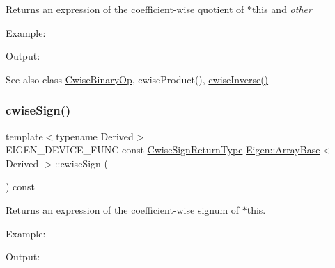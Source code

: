 \begin{DoxyReturn}{Returns}
an expression of the coefficient-\/wise quotient of $\ast$this and {\itshape other} 
\end{DoxyReturn}
Example\+: 
\begin{DoxyCodeInclude}{0}
\end{DoxyCodeInclude}
 Output\+: 
\begin{DoxyVerbInclude}
\end{DoxyVerbInclude}


\begin{DoxySeeAlso}{See also}
class \mbox{\hyperlink{class_eigen_1_1_cwise_binary_op}{Cwise\+Binary\+Op}}, cwise\+Product(), \mbox{\hyperlink{class_eigen_1_1_array_base_a37217e1af9759d31758b61cb9d9a2eb0}{cwise\+Inverse()}} 
\end{DoxySeeAlso}
\mbox{\label{class_eigen_1_1_array_base_a100fa382843831044abbf77ca9280eaa}} 
\subsubsection{\texorpdfstring{cwiseSign()}{cwiseSign()}}
{\footnotesize\ttfamily template$<$typename Derived$>$ \\
E\+I\+G\+E\+N\+\_\+\+D\+E\+V\+I\+C\+E\+\_\+\+F\+U\+NC const \mbox{\hyperlink{class_eigen_1_1_cwise_unary_op}{Cwise\+Sign\+Return\+Type}} \mbox{\hyperlink{class_eigen_1_1_array_base}{Eigen\+::\+Array\+Base}}$<$ Derived $>$\+::cwise\+Sign (\begin{DoxyParamCaption}{ }\end{DoxyParamCaption}) const\hspace{0.3cm}{\ttfamily [inline]}}

\begin{DoxyReturn}{Returns}
an expression of the coefficient-\/wise signum of $\ast$this.
\end{DoxyReturn}
Example\+: 
\begin{DoxyCodeInclude}{0}
\end{DoxyCodeInclude}
 Output\+: 
\begin{DoxyVerbInclude}
\end{DoxyVerbInclude}
 \mbox{\label{class_eigen_1_1_array_base_adc3329bedde0fbe79a4dc2389b2cffd9}} 
